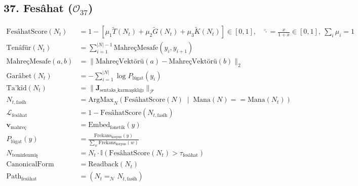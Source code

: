\documentclass[11pt, a4paper]{article}
\begin{document}
\subsection{37. Fesâhat ($\mathcal{O}_{37}$)}
\begin{align}
\text{FesâhatScore}(N_t) &= 1 - \left[ \mu_1 \tilde{T}(N_t) + \mu_2 \tilde{G}(N_t) + \mu_3 \tilde{K}(N_t) \right] \in [0,1], \quad \tilde{\cdot} = \tfrac{x}{1+x} \in [0,1], \ \textstyle\sum_i \mu_i = 1 \\
\text{Tenâfür}(N_t) &= \sum_{i=1}^{|N|-1} \text{MahreçMesafe}(y_i, y_{i+1}) \\
\text{MahreçMesafe}(a, b) &= \| \text{MahreçVektörü}(a) - \text{MahreçVektörü}(b) \|_2 \\
\text{Garâbet}(N_t) &= -\sum_{i=1}^{|N|} \log P_{\text{lügat}}(y_i) \\
\text{Ta'kîd}(N_t) &= \| \mathbf{J}_{\text{sentaks\_karmaşıklığı}} \|_{\mathcal{F}} \\
N_{t, \text{fasîh}} &= \text{ArgMax}_{N} \left( \text{FesâhatScore}(N) \;\middle|\; \text{Mana}(N) == \text{Mana}(N_t) \right) \\
\mathcal{L}_{\text{fesâhat}} &= 1 - \text{FesâhatScore}(N_{t, \text{fasîh}}) \\
\mathbf{v}_{\text{mahreç}} &= \text{Embed}_{\text{fonetik}}(y) \\
P_{\text{lügat}}(y) &= \frac{\text{Frekans}_{\text{korpus}}(y)}{\sum_{w} \text{Frekans}_{\text{korpus}}(w)} \\
N_{\text{temizlenmiş}} &= N_t \cdot \mathbb{I}(\text{FesâhatScore}(N_t) > \tau_{\text{fesâhat}}) \\
\text{CanonicalForm} &= \text{Readback}(N_t) \\
\text{Path}_{\text{fesâhat}} &= (N_t =_{\mathcal{N}} N_{t, \text{fasîh}})
\end{align}
\end{document}
